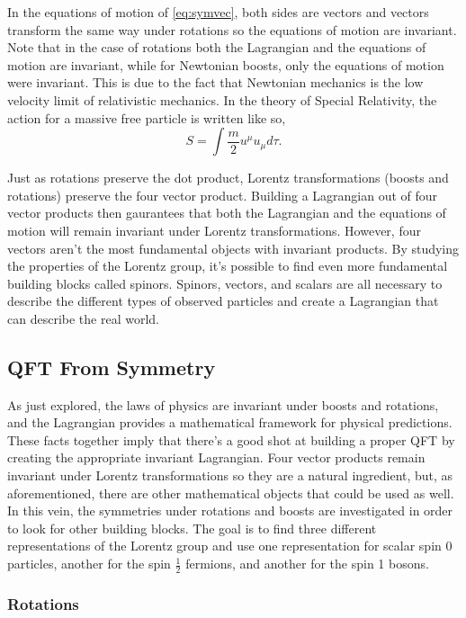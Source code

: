 In the equations of motion of \ref{eq:symvec}, both sides are vectors and vectors transform the same way under rotations so the equations of motion are invariant. Note that in the case of rotations both the Lagrangian and the equations of motion are invariant, while for Newtonian boosts, only the equations of motion were invariant. This is due to the fact that Newtonian mechanics is the low velocity limit of relativistic mechanics. In the theory of Special Relativity, the action for a massive free particle is written like so,
\begin{equation}
S = \int \frac{m}{2}u^{\mu}u_{\mu}d\tau.
\end{equation}

Just as rotations preserve the dot product, Lorentz transformations (boosts and rotations) preserve the four vector product. Building a Lagrangian out of four vector products then gaurantees that both the Lagrangian and the equations of motion will remain invariant under Lorentz transformations. However, four vectors aren't the most fundamental objects with invariant products. By studying the properties of the Lorentz group, it's possible to find even more fundamental building blocks called spinors. Spinors, vectors, and scalars are all necessary to describe the different types of observed particles and create a Lagrangian that can describe the real world. 

\subsection{QFT From Symmetry}

As just explored, the laws of physics are invariant under boosts and rotations, and the Lagrangian provides a mathematical framework for physical predictions. These facts together imply that there's a good shot at building a proper QFT by creating the appropriate invariant Lagrangian. Four vector products remain invariant under Lorentz transformations so they are a natural ingredient, but, as aforementioned, there are other mathematical objects that could be used as well. In this vein, the symmetries under rotations and boosts are investigated in order to look for other building blocks. The goal is to find three different representations of the Lorentz group and use one representation for scalar spin 0 particles, another for the spin $\frac{1}{2}$ fermions, and another for the spin 1 bosons.

\subsubsection{Rotations}

